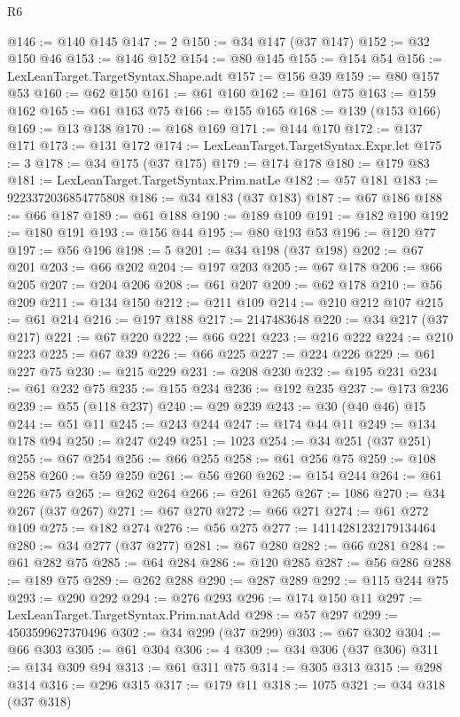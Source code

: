 \begin{lexlean}{R6}
\begin{coremodule}
@146 := @140 @145
@147 := 2
@150 := @34 @147 (@37 @147)
@152 := @32 @150 @46
@153 := @146 @152
@154 := @80 @145
@155 := @154 @54
@156 := LexLeanTarget.TargetSyntax.Shape.adt
@157 := @156 @39
@159 := @80 @157 @53
@160 := @62 @150
@161 := @61 @160
@162 := @161 @75
@163 := @159 @162
@165 := @61 @163 @75
@166 := @155 @165
@168 := @139 (@153 @166)
@169 := @13 @138
@170 := @168 @169
@171 := @144 @170
@172 := @137 @171
@173 := @131 @172
@174 := LexLeanTarget.TargetSyntax.Expr.let
@175 := 3
@178 := @34 @175 (@37 @175)
@179 := @174 @178
@180 := @179 @83
@181 := LexLeanTarget.TargetSyntax.Prim.natLe
@182 := @57 @181
@183 := 9223372036854775808
@186 := @34 @183 (@37 @183)
@187 := @67 @186
@188 := @66 @187
@189 := @61 @188
@190 := @189 @109
@191 := @182 @190
@192 := @180 @191
@193 := @156 @44
@195 := @80 @193 @53
@196 := @120 @77
@197 := @56 @196
@198 := 5
@201 := @34 @198 (@37 @198)
@202 := @67 @201
@203 := @66 @202
@204 := @197 @203
@205 := @67 @178
@206 := @66 @205
@207 := @204 @206
@208 := @61 @207
@209 := @62 @178
@210 := @56 @209
@211 := @134 @150
@212 := @211 @109
@214 := @210 @212 @107
@215 := @61 @214
@216 := @197 @188
@217 := 2147483648
@220 := @34 @217 (@37 @217)
@221 := @67 @220
@222 := @66 @221
@223 := @216 @222
@224 := @210 @223
@225 := @67 @39
@226 := @66 @225
@227 := @224 @226
@229 := @61 @227 @75
@230 := @215 @229
@231 := @208 @230
@232 := @195 @231
@234 := @61 @232 @75
@235 := @155 @234
@236 := @192 @235
@237 := @173 @236
@239 := @55 (@118 @237)
@240 := @29 @239
@243 := @30 (@40 @46) @15
@244 := @51 @11
@245 := @243 @244
@247 := @174 @44 @11
@249 := @134 @178 @94
@250 := @247 @249
@251 := 1023
@254 := @34 @251 (@37 @251)
@255 := @67 @254
@256 := @66 @255
@258 := @61 @256 @75
@259 := @108 @258
@260 := @59 @259
@261 := @56 @260
@262 := @154 @244
@264 := @61 @226 @75
@265 := @262 @264
@266 := @261 @265
@267 := 1086
@270 := @34 @267 (@37 @267)
@271 := @67 @270
@272 := @66 @271
@274 := @61 @272 @109
@275 := @182 @274
@276 := @56 @275
@277 := 14114281232179134464
@280 := @34 @277 (@37 @277)
@281 := @67 @280
@282 := @66 @281
@284 := @61 @282 @75
@285 := @64 @284
@286 := @120 @285
@287 := @56 @286
@288 := @189 @75
@289 := @262 @288
@290 := @287 @289
@292 := @115 @244 @75
@293 := @290 @292
@294 := @276 @293
@296 := @174 @150 @11
@297 := LexLeanTarget.TargetSyntax.Prim.natAdd
@298 := @57 @297
@299 := 4503599627370496
@302 := @34 @299 (@37 @299)
@303 := @67 @302
@304 := @66 @303
@305 := @61 @304
@306 := 4
@309 := @34 @306 (@37 @306)
@311 := @134 @309 @94
@313 := @61 @311 @75
@314 := @305 @313
@315 := @298 @314
@316 := @296 @315
@317 := @179 @11
@318 := 1075
@321 := @34 @318 (@37 @318)

\end{coremodule}
\end{lexlean}
